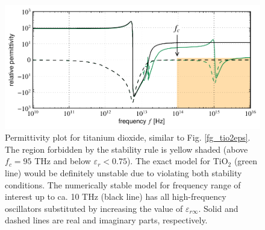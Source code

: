\begin{figure}[t] \caption{Permittivity plot for titanium dioxide, similar to Fig. \ref{fg_tio2eps}. 
The region forbidden by the stability rule is yellow shaded (above $f_c = 95$ THz and below $\varepsilon_r < 0.75$). The exact model for TiO$_{2}$ (green line) would be definitely unstable due to violating both stability conditions. The numerically stable model for frequency range of interest up to ca. 10 THz (black line) has all high-frequency oscillators substituted by increasing the value of $\varepsilon_{r\infty}$. Solid and dashed lines are real and imaginary parts, respectively. } \label{fg_tio2eps_stripped} \centering 
	\includegraphics[width=14cm]{img/epsilon_TiO2stripped_symlog.pdf}
\end{figure}

